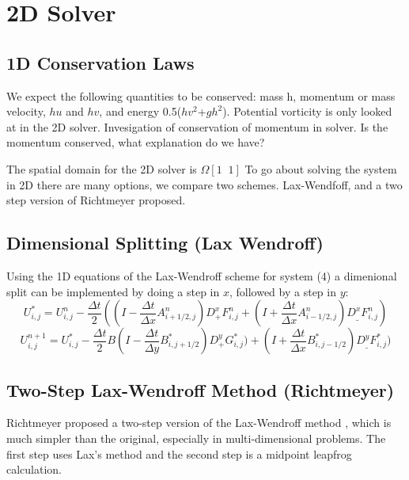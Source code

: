 
\section{2D Solver}
\subsection{1D Conservation Laws}
We expect the following quantities to be conserved: mass h, momentum or mass velocity, $hu$ and $hv$, and
energy 0.5($hv^2$+$gh^2$). Potential vorticity is only looked at in the 2D solver. Invesigation of conservation of momentum in solver.
 Is the momentum conserved, what explanation do we have?

The spatial domain for the 2D solver is $\Omega [1\;\;1]$ To go about solving the system in 2D there are many options,
we compare two schemes. Lax-Wendfoff, and a two step version of Richtmeyer proposed. \newline
\newline

\subsection{Dimensional Splitting (Lax Wendroff)}

Using the 1D equations of the Lax-Wendroff scheme for system (4) a dimenional split can be implemented by 
doing a step in $x$, followed by a step in $y$: 
\begin{equation}\label{eqn:6}
U_{i,j}^* = U_{i,j}^n - \frac{\Delta t}{2} (( I- \frac{\Delta t}{\Delta x} A_{i+1/2,j}^n ) D_+^xF_{i,j}^n + (I+ \frac{\Delta
t}{\Delta x} A_{i-1/2,j}^n) D_{\_}^xF_{i,j}^n)
\end{equation}
\begin{equation}\label{eqn:7}
U_{i,j}^{n+1} = U_{i,j}^* - \frac{\Delta t}{2} B(I - \frac{\Delta t}{\Delta y} B_{i,j+1/2}^*) D_+^yG_{i,j}^*) +(I + \frac{\Delta
t}{\Delta x} B_{i,j-1/2}^* ) D_{\_}^y F_{i,j}^* )
\end{equation}
\newline


\subsection{Two-Step Lax-Wendroff Method (Richtmeyer)}

Richtmeyer proposed a two-step version of the Lax-Wendroff method \cite{Roach}, which is much simpler than the original, especially in multi-dimensional problems.
The first step uses Lax's  method and the second step is a midpoint leapfrog calculation. 

